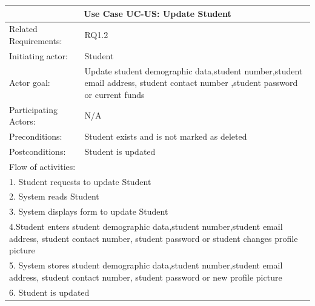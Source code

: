 \documentclass[12pt]{article}
\begin{document}
{		\begin{tabular}{| l | p{10cm}| }
			\hline\multicolumn{2}{|c|}{ \textbf{Use Case UC-US: Update Student}} \\ \hline
			Related Requirements: & RQ1.2\\ \hline
			Initiating actor: & Student \\ \hline
			Actor goal: & Update student demographic data,student number,student email address, student contact number ,student password or current funds\\ \hline
			Participating Actors: & N/A\\ \hline
			Preconditions: & Student exists and is not marked as deleted\\ \hline
			Postconditions: & Student is updated\\ \hline
			\multicolumn{2}{|l|}{Flow of activities:}\\ \hline
			\multicolumn{2}{|p{15cm}|}{1. Student requests to update Student}\\
			\multicolumn{2}{|p{15cm}|}{2. System reads Student}\\
			\multicolumn{2}{|p{15cm}|}{3. System displays form to update Student}\\
			\multicolumn{2}{|p{15cm}|}{4.Student enters student demographic data,student number,student email address, student contact number, student password or student changes profile picture}	\\
			\multicolumn{2}{|p{15cm}|}{5. System stores student demographic data,student number,student email address, student contact number, student password or new profile picture}\\
			\multicolumn{2}{|l|}{6. Student is updated}
			\\ \hline
		\end{tabular}





		\begin{tabular}{| l | l| }


\end{tabular}}
\end{document}
